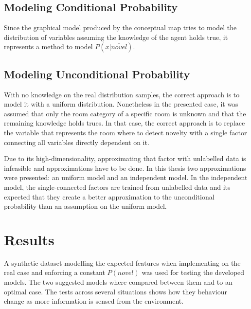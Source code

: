 \documentclass[9pt,a4paper]{extarticle}
\begin{document}
\begin{multicols}{2}
\subsection{Modeling Conditional Probability}
Since the graphical model produced by the conceptual map tries to model the distribution of
variables assuming the knowledge of the agent holds true, it represents a method to model
$P(x|\overline{novel})$.

\subsection{Modeling Unconditional Probability}
With no knowledge on the real distribution samples, the correct approach is to model it
with a uniform distribution. Nonetheless in the presented case, it was assumed that only the room
category of a specific room is unknown and that the remaining knowledge holds trues.
In that case, the correct approach is to replace the variable that represents the room where to
detect novelty with a single factor connecting all variables directly dependent on it. 

Due to its high-dimensionality, approximating that factor with unlabelled data is infeasible and
approximations have to be done. In this thesis two approximations were presented: an uniform model
and an independent model. In the independent model, the
single\hyp{}connected factors are trained from unlabelled data and its expected that they create a better
approximation to the unconditional probability than an assumption on the uniform model.

\section{Results}
A synthetic dataset modelling the expected features when implementing on the real case and enforcing
a constant $P(novel)$ was used for testing the developed models.
The two suggested models where compared between them and to an optimal case.
The tests across several situations shows how they behaviour change as more information is sensed
from the environment.


\end{multicols}
\end{document}
